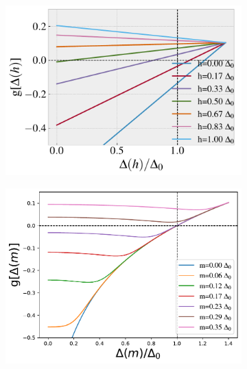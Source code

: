 \documentclass[aps,twocolumn,amsmath,amssymb,preprintnumbers,floatfix,prl,superscriptaddress,longbibliography]{revtex4-2}%
\begin{document}
\begin{figure}[htb]
    \centering
    \begin{subfigure}{0.49 \linewidth}
    \includegraphics[width = \linewidth]{plots_maintext/g_hx_mu=-0.5_m=0.00_neghT=0.01.pdf}
    \end{subfigure}
    \begin{subfigure}{0.49 \linewidth}
    \includegraphics[width = \linewidth]{plots_maintext/g_m_mu=-0.5_h=0.00T=0.01.pdf}
    \end{subfigure}
    \begin{subfigure}{0.49 \linewidth}

\end{subfigure}
\end{figure}
\end{document}
